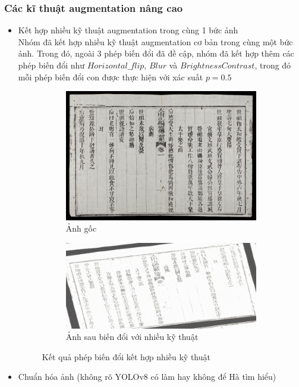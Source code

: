 \documentclass[a4paper,12pt]{article}
\begin{document}
\subsubsection{Các kĩ thuật augmentation nâng cao}

\begin{itemize}
    \item Kết hợp nhiều kỹ thuật augmentation trong cùng 1 bức ảnh
    \\Nhóm đã kết hợp nhiều kỹ thuật augmentation cơ bản trong cùng một bức ảnh. Trong đó, ngoài $3$ phép biến đổi đã đề cập, nhóm đã kết hợp thêm các phép biến đổi như $Horizontal\_flip$, $Blur$ và $BrightnessContrast$, trong đó mỗi phép biến đổi con được thực hiện với xác suất $p=0.5$
    \begin{figure}[H]
        \centering
        \begin{subfigure}{.4\textwidth}
          \includegraphics[width=1\linewidth]{images/original_img_2.jpg}
          \caption{Ảnh gốc}
        \end{subfigure}
        \hspace{20mm}
        \begin{subfigure}{.4\textwidth}
          \includegraphics[width=1\linewidth]{images/combined_img.png}
          \caption{Ảnh sau biến đổi với nhiều kỹ thuật}
        \end{subfigure}
        \caption{Kết quả phép biến đổi kết hợp nhiều kỹ thuật}
    \end{figure}
    \item Chuẩn hóa ảnh (không rõ YOLOv8 có làm hay không để Hà tìm hiểu)
\end{itemize}
\end{document}
